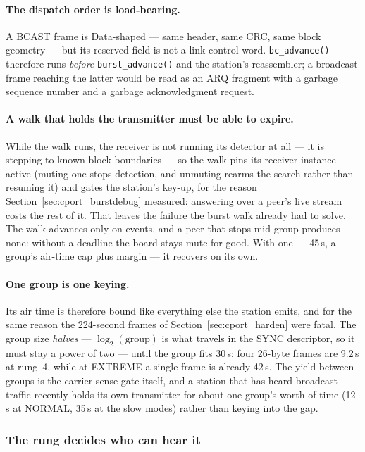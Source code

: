 \paragraph{The dispatch order is load-bearing.} A BCAST frame is
Data-shaped --- same header, same CRC, same block geometry --- but its
reserved field is not a link-control word. \texttt{bc\_advance()}
therefore runs \emph{before} \texttt{burst\_advance()} and the
station's reassembler; a broadcast frame reaching the latter would be
read as an ARQ fragment with a garbage sequence number and a garbage
acknowledgment request.

\paragraph{A walk that holds the transmitter must be able to expire.}
While the walk runs, the receiver is not running its detector at all
--- it is stepping to known block boundaries --- so the walk pins its
receiver instance active (muting one stops detection, and unmuting
rearms the search rather than resuming it) and gates the station's
key-up, for the reason Section~\ref{sec:cport_burstdebug} measured:
answering over a peer's live stream costs the rest of it. That leaves
the failure the burst walk already had to solve. The walk advances only
on events, and a peer that stops mid-group produces none: without a
deadline the board stays mute for good. With one --- 45\,s, a group's
air-time cap plus margin --- it recovers on its own.

\paragraph{One group is one keying.} Its air time is therefore bound
like everything else the station emits, and for the same reason the
224-second frames of Section~\ref{sec:cport_harden} were fatal. The
group size \emph{halves} --- $\log_2(\text{group})$ is what travels in
the SYNC descriptor, so it must stay a power of two --- until the group
fits 30\,s: four 26-byte frames are 9.2\,s at rung~4, while at EXTREME
a single frame is already 42\,s. The yield between groups is the
carrier-sense gate itself, and a station that has heard broadcast
traffic recently holds its own transmitter for about one group's worth
of time (12\,s at NORMAL, 35\,s at the slow modes) rather than keying
into the gap.

\subsubsection*{The rung decides who can hear it}

